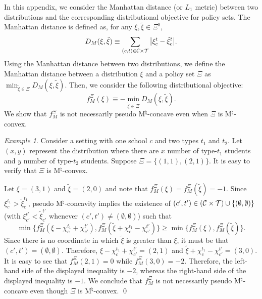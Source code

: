 \documentclass[12pt]{amsart}
\theoremstyle{remark}
\newtheorem{example}{Example}
\begin{document}
In this appendix, we consider the Manhattan distance (or $L_1$ metric) between two
distributions and the corresponding distributional objective for policy sets. The Manhattan distance is defined as, for any $\xi, \tilde \xi \in \Xi^0$,
\begin{equation*}
D_M(\xi,\tilde{\xi}) \equiv  \sum_{(c,t)\in \calc \times \calt} \mathlarger{\mid} \xi_c^t-\tilde{\xi}_c^t \mathlarger{\mid}.
\end{equation*}
Using the Manhattan distance between two distributions, we define the Manhattan distance between a distribution $\xi$
and a policy set $\Xi$ as $\min_{\tilde{\xi} \in \Xi}  D_M(\xi,\tilde{\xi})$. Then, we consider the following
distributional objective:
\begin{equation*}
f_M^{\Xi}(\xi) \equiv - \min_{\tilde{\xi} \in \Xi}  D_M(\xi,\tilde{\xi}). %
\end{equation*}
We show that $f_M^{\Xi}$ is not necessarily pseudo M$^{\natural}$-concave even when $\Xi$ is M$^{\natural}$-convex.

\begin{example}
Consider a setting with one school $c$ and two types $t_1$ and $t_2$. Let $(x,y)$ represent the distribution where there are $x$
number of type-$t_1$ students and $y$ number of type-$t_2$ students. Suppose $\Xi=\{(1,1),(2,1)\}$.
It is easy to verify that $\Xi$ is M$^{\natural}$-convex.

Let $\xi=(3,1)$ and $\tilde{\xi}=(2,0)$ and note that $f_M^{\Xi}(\xi)=f_M^{\Xi}(\tilde{\xi})=-1$. Since $\xi_c^{t_1}>\tilde{\xi}_c^{t_1}$, pseudo M$^{\natural}$-concavity
implies the existence of $(c',t') \in \left( \mathcal{C} \times \mathcal{T} \right) \cup \{(\emptyset,\emptyset)\}$
(with $\xi_{c'}^{t'}<\tilde{\xi}_{c'}^{t'}$ whenever $(c',t')\neq (\emptyset,\emptyset)$) such that
\begin{equation*}
  \min \{f_M^{\Xi}(\xi-\chi_c^{t_1}+\chi_{c'}^{t'}), f_M^{\Xi}(\tilde{\xi}+\chi_c^{t_1}-\chi_{c'}^{t'})\} \geq \min \{f_M^{\Xi}(\xi),f_M^{\Xi}(\tilde{\xi})\}.
\end{equation*}
Since there is no coordinate in which $\tilde\xi$ is greater than $\xi$, it must be that $(c',t')=(\emptyset,\emptyset)$. Therefore,
$\xi-\chi_c^{t_1}+\chi_{c'}^{t'}=(2,1)$ and $\tilde{\xi}+\chi_c^{t_1}-\chi_{c'}^{t'}=(3,0)$. It is easy to see that
$f_M^{\Xi}(2,1)=0$ while $f_M^{\Xi}(3,0)=-2$. Therefore, the left-hand side of the displayed inequality is $-2$, whereas
the right-hand side of the displayed inequality is $-1$. We conclude that
$f_M^{\Xi}$ is not necessarily pseudo M$^{\natural}$-concave even though $\Xi$ is M$^{\natural}$-convex.
\qed
\end{example}
\end{document}
